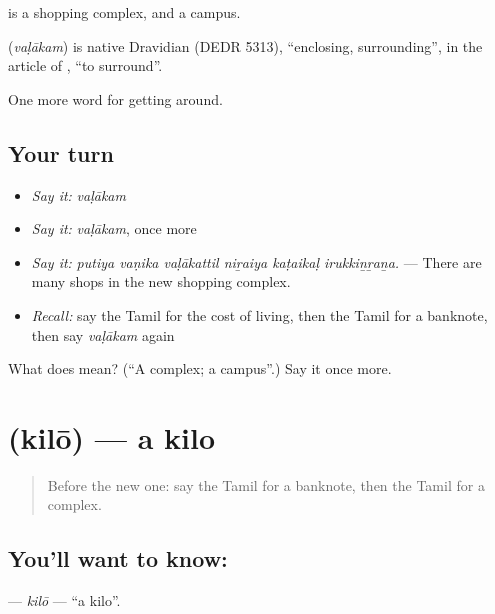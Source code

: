   is a shopping complex, and   a campus.

\begin{cousinweb}
\textbf{} (\emph{vaḷākam}) is native Dravidian (DEDR 5313), \textquotedblleft{}enclosing, surrounding\textquotedblright{}, in the article of , \textquotedblleft{}to surround\textquotedblright{}.
\end{cousinweb}

\begin{grammarlens}[title={What you've built}]
One more word for getting around.
\end{grammarlens}

\subsection*{Your turn}
\begin{itemize}
\raggedright
  \item \emph{Say it:} \emph{vaḷākam}
  \item \emph{Say it:} \emph{vaḷākam}, once more
  \item \emph{Say it:} \emph{putiya vaṇika vaḷākattil niṟaiya kaṭaikaḷ irukkiṉṟaṉa.} — There are many shops in the new shopping complex.
  \item \emph{Recall:} say the Tamil for the cost of living, then the Tamil for a banknote, then say \emph{vaḷākam} again
\end{itemize}

\begin{tcolorbox}[breakable,colback=teal!4,colframe=teal!35!black,title={Before you move on}]
What does  mean? (\textquotedblleft{}A complex; a campus\textquotedblright{}.) Say it once more.
\end{tcolorbox}
\section[\texorpdfstring{\ta{கிலோ} (kilō)}{கிலோ (kilō)}]{ (kilō) — a kilo}

\label{lesson:TA-C451-kilo}



\begin{quote}
Before the new one: say the Tamil for a banknote, then the Tamil for a complex.
\end{quote}

\subsection*{You'll want to know: }
\textbf{} — \emph{kilō} — \textquotedblleft{}a kilo\textquotedblright{}.

